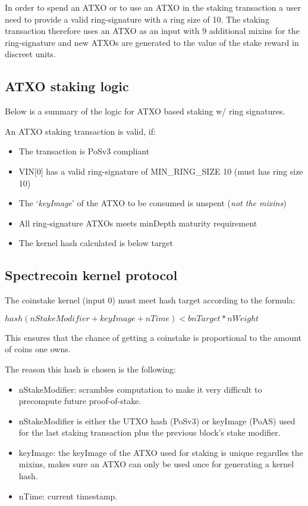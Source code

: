 In order to spend an ATXO or to use an ATXO in the staking transaction a user 
need to provide a valid ring-signature with a ring size of 10. The staking 
transaction therefore uses an ATXO as an input with 9 additional mixins for 
the ring-signature and new ATXOs are generated to the value of the stake 
reward in discreet units. 



\subsection{ATXO staking logic}
Below is a summary of the logic for ATXO based staking w/ ring signatures. 



An ATXO staking transaction is valid, if: 
\begin{itemize}
	\item The transaction is PoSv3 compliant 
	\item VIN[0] has a valid ring-signature of MIN\_RING\_SIZE 10 (must has ring size 10) 
	\item The ‘\textit{keyImage}’ of the ATXO to be consumed is unspent (\textit{not the mixins}) 
	\item All ring-signature ATXOs meets minDepth maturity requirement 
	\item The kernel hash calculated is below target 
\end{itemize}



\subsection{Spectrecoin kernel protocol}
The coinstake kernel (input 0) must meet hash target according to the formula: 



\vspace{5mm} %
$ hash(nStakeModifier + keyImage + nTime) < bnTarget * nWeight  $
\vspace{5mm} %



This ensures that the chance of getting a coinstake is proportional to 
the amount of coins one owns. 



The reason this hash is chosen is the following: 
\begin{itemize}
	\item nStakeModifier: scrambles computation to make it very difficult to precompute future proof-of-stake. 
	\item nStakeModifier is either the UTXO hash (PoSv3) or keyImage (PoAS) used for the last staking transaction plus the previous block's stake modifier. 
	\item keyImage: the keyImage of the ATXO used for staking is unique regardles the mixins, makes sure an ATXO can only be used once for generating a kernel hash. 
	\item nTime: current timestamp. 
\end{itemize}



